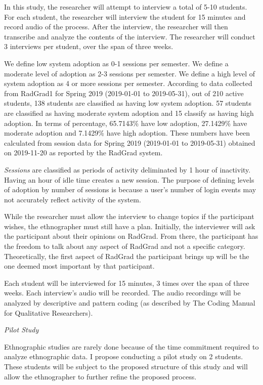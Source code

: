 \documentclass[english]{proposalnsf}
\begin{document}
In this study, the researcher will attempt to interview a total of 5-10 students. For each student, the researcher will interview the student for 15 minutes and record audio of the process. After the interview, the researcher will then transcribe and analyze the contents of the interview. The researcher will conduct 3 interviews per student, over the span of three weeks.  

We define low system adoption as 0-1 sessions per semester. We define a moderate level of adoption as 2-3 sessions per semester.  We define a high level of system adoption as 4 or more sessions per semester. 
According to data collected from RadGrad1 for Spring 2019 (2019-01-01 to 2019-05-31), out of 210 active students, 138 students are classified as having low system adoption. 57 students are classified as having moderate system adoption and 15 classify as having high adoption. In terms of percentage, 65.7143{\%} have low adoption, 27.1429{\%} have moderate adoption and 7.1429{\%} have high adoption. These numbers have been calculated from session data for Spring 2019 (2019-01-01 to 2019-05-31) obtained on 2019-11-20 as reported by the RadGrad system. 

{\em Sessions} are classified as periods of activity deliminated by 1 hour of inactivity. Having an hour of idle time creates a new session. The purpose of defining levels of adoption by number of sessions is because a user's number of login events may not accurately reflect activity of the system. 

While the researcher must allow the interview to change topics if the participant wishes, the ethnographer must still have a plan. Initially, the interviewer will ask the participant about their opinions on RadGrad. From there, the participant has the freedom to talk about any aspect of RadGrad and not a specific category. Theoretically, the first aspect of RadGrad the participant brings up will be the one deemed most important by that participant. 

Each student will be interviewed for 15 minutes, 3 times over the span of three weeks. Each interview's audio will be recorded. The audio recordings will be analyzed by descriptive and pattern coding (as described by The Coding Manual for Qualitative Researchers).

{\em Pilot Study}

Ethnographic studies are rarely done because of the time commitment required to analyze ethnographic data. I propose conducting a pilot study on 2 students. These students will be subject to the proposed structure of this study and will allow the ethnographer to further refine the proposed process. 
\end{document}
